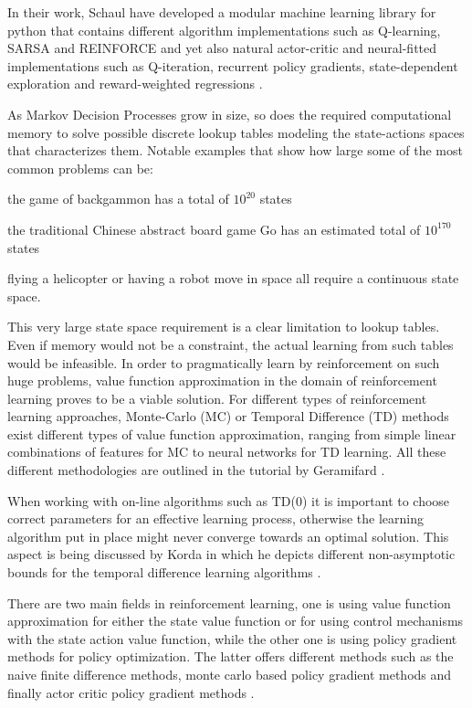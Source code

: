 \documentclass{seal_thesis}
\begin{document}
In their work, Schaul \etal have developed a modular machine learning library for python that contains different algorithm implementations such as Q-learning, SARSA and REINFORCE and yet also natural actor-critic and neural-fitted implementations such as Q-iteration, recurrent policy gradients, state-dependent exploration and reward-weighted regressions \cite{Schaul2010}.

As Markov Decision Processes grow in size, so does the required computational memory to solve possible discrete lookup tables modeling the state-actions spaces that characterizes them. Notable examples that show how large some of the most common problems can be:
\begin{enumerate*}
	\item the game of backgammon has a total of $10^{20}$ states
	\item the traditional Chinese abstract board game Go has an estimated total of $10^{170}$ states
	\item flying a helicopter or having a robot move in space all require a continuous state space.
\end{enumerate*}

This very large state space requirement is a clear limitation to lookup tables. Even if memory would not be a constraint, the actual learning from such tables would be infeasible. In order to pragmatically learn by reinforcement on such huge problems, value function approximation in the domain of reinforcement learning proves to be a viable solution. For different types of reinforcement learning approaches, \ie Monte-Carlo (MC) or Temporal Difference (TD) methods exist different types of value function approximation, ranging from simple linear combinations of features for MC to neural networks for TD learning. All these different methodologies are outlined in the tutorial by Geramifard \cite{Geramifard2013}.

When working with on-line algorithms such as TD(0) it is important to choose correct parameters for an effective learning process, otherwise the learning algorithm put in place might never converge towards an optimal solution. This aspect is being discussed by Korda in which he depicts different non-asymptotic bounds for the temporal difference learning algorithms \cite{Korda2014}.

There are two main fields in reinforcement learning, one is using value function approximation for either the state value function or for using control mechanisms with the state action value function, while the other one is using policy gradient methods for policy optimization. The latter offers different methods such as the naive finite difference methods, monte carlo based policy gradient methods and finally actor critic policy gradient methods \cite{Silver2014}.
\end{document}
